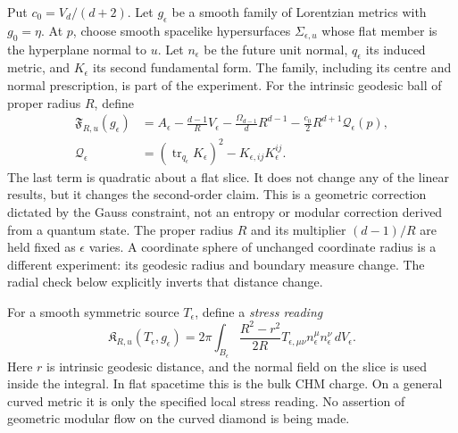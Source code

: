 \documentclass[12pt]{article}
\theoremstyle{definition}
\theoremstyle{remark}
\begin{document}
Put $c_0=V_d/(d+2)$. Let $g_\epsilon$ be a smooth family of Lorentzian
metrics with $g_0=\eta$. At $p$, choose smooth spacelike hypersurfaces
$\Sigma_{\epsilon,u}$ whose flat member is the hyperplane normal to $u$.
Let $n_\epsilon$ be the future unit normal, $q_\epsilon$ its induced
metric, and $K_\epsilon$ its second fundamental form. The family, including
its centre and normal prescription, is part of the experiment.
For the intrinsic geodesic ball of proper radius $R$, define
\begin{align}
 \mathfrak F_{R,u}(g_\epsilon)
 &=A_\epsilon-\frac{d-1}{R}V_\epsilon
       -\frac{\Omega_{d-1}}d R^{d-1}
       -\frac{c_0}2R^{d+1}\mathcal Q_\epsilon(p),
       \label{eq:secondF}\\
 \mathcal Q_\epsilon&=(\operatorname{tr}_{q_\epsilon}K_\epsilon)^2
                 -K_{\epsilon,ij}K_\epsilon^{ij}.\nonumber
\end{align}
The last term is quadratic about a flat slice. It does not change any of
the linear results, but it changes the second-order claim. This is a
geometric correction dictated by the Gauss constraint, not an entropy
or modular correction derived from a quantum state.
The proper radius $R$ and its multiplier $(d-1)/R$ are held fixed as
$\epsilon$ varies. A coordinate sphere of unchanged coordinate radius
is a different experiment: its geodesic radius and boundary measure
change. The radial check below explicitly inverts that distance change.

For a smooth symmetric source $T_\epsilon$, define a \emph{stress reading}
\begin{equation}
 \mathfrak K_{R,u}(T_\epsilon,g_\epsilon)
 =2\pi\int_{B_\epsilon}\frac{R^2-r^2}{2R}
                T_{\epsilon,\mu\nu}n_\epsilon^\mu n_\epsilon^\nu\,dV_\epsilon.
 \label{eq:secondK}
\end{equation}
Here $r$ is intrinsic geodesic distance, and the normal field on the
slice is used inside the integral. In flat spacetime this is the bulk
CHM charge. On a general curved metric it is only the specified local
stress reading. No assertion of geometric modular flow on the curved
diamond is being made.
\end{document}

